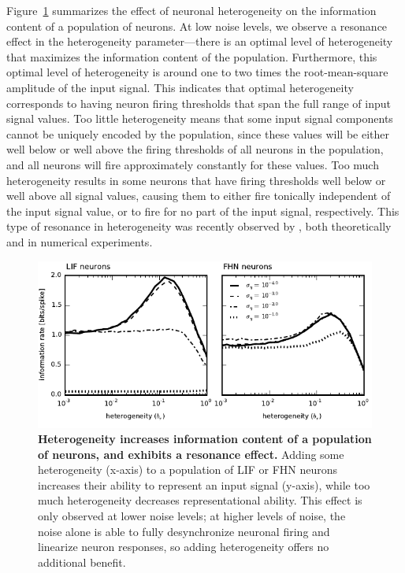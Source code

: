 \documentclass[12pt]{article}
\begin{document}
Figure~\ref{fig:infohetero} summarizes the effect of neuronal heterogeneity on the information content of a population of neurons. At low noise levels, we observe a resonance effect in the heterogeneity parameter---there is an optimal level of heterogeneity that maximizes the information content of the population. Furthermore, this optimal level of heterogeneity is around one to two times the root-mean-square amplitude of the input signal. This indicates that optimal heterogeneity corresponds to having neuron firing thresholds that span the full range of input signal values. Too little heterogeneity means that some input signal components cannot be uniquely encoded by the population, since these values will be either well below or well above the firing thresholds of all neurons in the population, and all neurons will fire approximately constantly for these values. Too much heterogeneity results in some neurons that have firing thresholds well below or well above all signal values, causing them to either fire tonically independent of the input signal value, or to fire for no part of the input signal, respectively. This type of resonance in heterogeneity was recently observed by \cite{Mejias2012}, both theoretically and in numerical experiments.

\begin{figure}
  \ifx\hidefigures\undefined
    \centering
    \includegraphics[width=\textwidth]{figure2_infohetero.pdf}
  \fi
  \caption{
    \textbf{Heterogeneity increases information content of a population of neurons, and exhibits a resonance effect.}
    Adding some heterogeneity (x-axis) to a population of LIF or FHN neurons increases their ability to represent an input signal (y-axis), while too much heterogeneity decreases representational ability. This effect is only observed at lower noise levels; at higher levels of noise, the noise alone is able to fully desynchronize neuronal firing and linearize neuron responses, so adding heterogeneity offers no additional benefit.
  }
  \label{fig:infohetero}
\end{figure}
\end{document}
